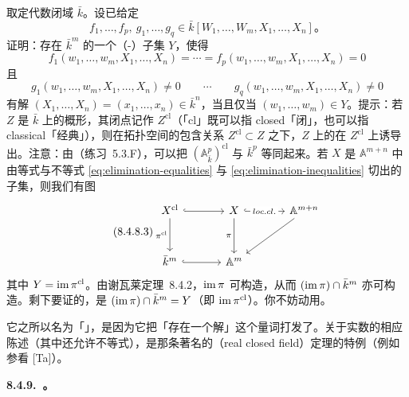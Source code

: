 \begin{exercise}\label{ex:elimination-quantifiers}
取定代数闭域 $\bar{k}$。设已给定
\[
f_1,\dots,f_p,\ g_1,\dots,g_q\in\bar{k}[W_1,\dots,W_m,X_1,\dots,X_n]\text{。}
\]
证明：存在 $\bar{k}^m$ 的一个（\trZariski-）\trConstructible{}子集 $Y$，使得
\begin{equation*}\tag{8.4.8.1}\label{eq:elimination-equalities}
f_1(w_1,\dots,w_m,X_1,\dots,X_n)=\cdots=f_p(w_1,\dots,w_m,X_1,\dots,X_n)=0
\end{equation*}
且
\begin{equation*}\tag{8.4.8.2}\label{eq:elimination-inequalities}
g_1(w_1,\dots,w_m,X_1,\dots,X_n)\neq0\qquad\cdots\qquad g_q(w_1,\dots,w_m,X_1,\dots,X_n)\neq0
\end{equation*}
有解 $(X_1,\dots,X_n)=(x_1,\dots,x_n)\in\bar{k}^n$，当且仅当 $(w_1,\dots,w_m)\in Y$。提示：若 $Z$ 是 $\bar{k}$ 上\trFiniteType{}的概形，其闭点记作 $Z^{\mathrm{cl}}$（「cl」既可以指 closed「闭」，也可以指 classical「经典」），则在拓扑空间的包含关系 $Z^{\mathrm{cl}}\subset Z$ 之下，$Z$ 上的\trZariskiTopology{}在 $Z^{\mathrm{cl}}$ 上诱导出\trZariskiTopology。注意：由\trNullstellensatz（\mbox{练习~5.3.F}），可以把 $(\mathbb{A}^p_{\bar{k}})^{\mathrm{cl}}$ 与 $\bar{k}^p$ 等同起来。若 $X$ 是 $\mathbb{A}^{m+n}$ 中由等式与不等式 \eqref{eq:elimination-equalities} 与 \eqref{eq:elimination-inequalities} 切出的\trLocally\trClosed{}子集，则我们有图
\begin{equation*}\tag{8.4.8.3}\label{eq:elimination-diagram}
\begin{tikzcd}[row sep=3em, column sep=3.4em]
X^{\mathrm{cl}} \ar[r, hook] \ar[d, "\pi^{\mathrm{cl}}"'] &
X \ar[r, hook, "loc.cl." description] \ar[d, "\pi"'] &
\mathbb{A}^{m+n} \ar[dl] \\
\bar{k}^{m} \ar[r, hook] & \mathbb{A}^{m}
\end{tikzcd}
\end{equation*}
其中 $Y=\operatorname{im}\pi^{\mathrm{cl}}$。由谢瓦莱定理~8.4.2，$\operatorname{im}\pi$ 可构造，从而 $(\operatorname{im}\pi)\cap\bar{k}^m$ 亦可构造。剩下要证的，是 $(\operatorname{im}\pi)\cap\bar{k}^m=Y$（即 $\operatorname{im}\pi^{\mathrm{cl}}$）。你不妨动用\trNullstellensatz。
\end{exercise}

它之所以名为「\trEliminationOfQuantifiers{}」，是因为它把「存在一个解」这个量词打发了。关于实数的相应陈述（其中还允许不等式），是\trTarski{}那条著名的\trRealClosedField{}（real closed field）\trEliminationOfQuantifiers{}定理的特例（例如参看 [Ta]）。

\textbf{8.4.9.\ \trFundamentalTheoremOfEliminationTheory{}。}


